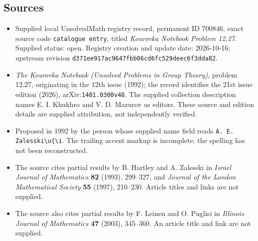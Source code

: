 \documentclass[11pt]{article}
\begin{document}
\subsection{Sources}
\begin{itemize}
\item Supplied local UnsolvedMath registry record, permanent ID \(700846\), exact source code \texttt{catalogue entry}, titled \emph{Kourovka Notebook Problem 12.27}. Supplied status: open. Registry creation and update date: 2026-10-16; upstream revision \texttt{d371ee917ac9647fbb06cd6fc529deec6f3dda82}.
\item \emph{The Kourovka Notebook (Unsolved Problems in Group Theory)}, problem 12.27, originating in the 12th issue (1992); the record identifies the 21st issue edition (2026), arXiv:\texttt{1401.0300v48}. The supplied collection description names E. I. Khukhro and V. D. Mazurov as editors. These source and edition details are supplied attribution, not independently verified.
\item Proposed in 1992 by the person whose supplied name field reads \texttt{A. E. Zalesski\textbackslash u\{\textbackslash i}. The trailing accent markup is incomplete; the spelling has not been reconstructed.
\item The source cites partial results by B. Hartley and A. Zalesski in \emph{Israel Journal of Mathematics} \textbf{82} (1993), 299--327, and \emph{Journal of the London Mathematical Society} \textbf{55} (1997), 210--230. Article titles and links are not supplied.
\item The source also cites partial results by F. Leinen and O. Puglisi in \emph{Illinois Journal of Mathematics} \textbf{47} (2003), 345--360. An article title and link are not supplied.
\end{itemize}
\end{document}
